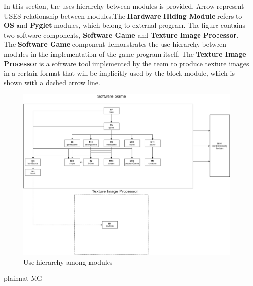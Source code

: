 \documentclass[12pt, titlepage]{article}
\begin{document}
In this section, the uses hierarchy between modules is
provided. Arrow represent USES relationship between modules.The \textbf{Hardware Hiding Module} refers to \textbf{OS} and \textbf{Pyglet} modules, which belong to external program. The figure contains two software components, \textbf{Software Game} and \textbf{Texture Image Processor}. The \textbf{Software Game} component demonstrates the use hierarchy between modules in the implementation of the game program itself. The \textbf{Texture Image Processor} is a software tool implemented by the team to produce texture images in a certain format that will be implicitly used by the block module, which is shown with a dashed arrow line.

\begin{figure}[H]
\centering
\includegraphics[width=1.05\textwidth]{use.png}
\caption{Use hierarchy among modules}
\label{FigUH}
\end{figure}


 {plainnat}
 {MG}
\end{document}
